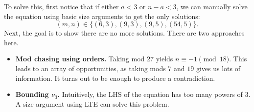 \documentclass{scrartcl}
\begin{document}
To solve this, first notice that if either $a < 3$ or $n-a < 3$, we can manually solve the equation using basic size arguments to get the only solutions:
\[ (m,n) \in \{(6,3),(9,3),(9,5),(54,5)\}. \]
Next, the goal is to show there are no more solutions.
There are two approaches here.

\begin{itemize}
    \item \textbf{Mod chasing using orders.}
    Taking mod $27$ yields $n \equiv -1\pmod{18}$.
    This leads to an array of opportunities, as taking mods $7$ and $19$ gives us lots of information.
    It turns out to be enough to produce a contradiction.
    \item \textbf{Bounding $\nu_3$.}
    Intuitively, the LHS of the equation has too many powers of $3$.
    A size argument using LTE can solve this problem.
\end{itemize}
\end{document}
